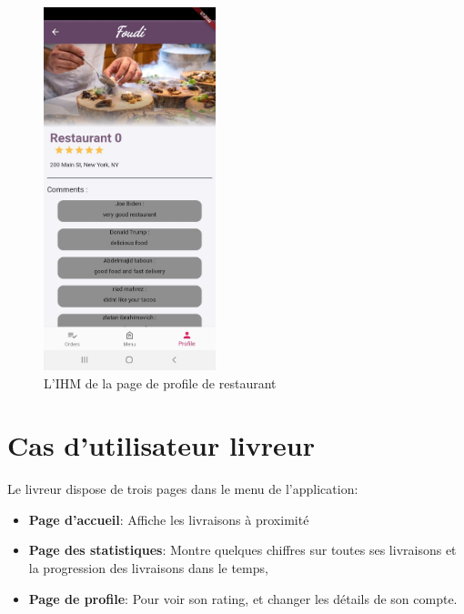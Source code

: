 \documentclass[french, a4paper, 12pt]{report}
\begin{document}
	\begin{figure}[h!]
			\center
			\includegraphics[width=5cm]{screenshots/Restaurantviews/ProfileWithReviews.jpg}
			\caption{L'IHM de la page de profile de restaurant}
			\label{fig:restprof}	
		\end{figure}
		
		
	\newpage
	\section{Cas d'utilisateur livreur} Le livreur dispose de trois pages dans le menu de l'application:
		\begin{itemize}
			\item \textbf{Page d'accueil}: Affiche les livraisons à proximité
			\item \textbf{Page des statistiques}: Montre quelques chiffres sur toutes ses livraisons et la progression des livraisons dans le temps,
			\item \textbf{Page de profile}: Pour voir son rating, et changer les détails de son compte.
		\end{itemize}
	
\end{document}

